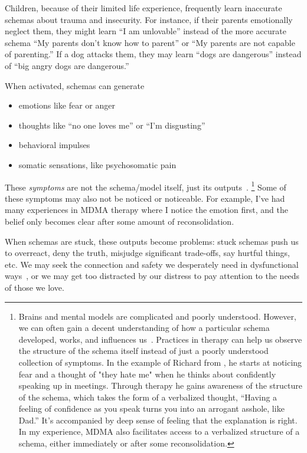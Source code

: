 \documentclass[11pt,oneside]{book}
\let\cite\parencite
\begin{document}
Children, because of their limited life experience, frequently learn inaccurate schemas about trauma and insecurity. For instance, if their parents emotionally neglect them, they might learn \enquote{I am unlovable} instead of the more accurate schema \enquote{My parents don't know how to parent} or \enquote{My parents are not capable of parenting.} If a dog attacks them, they may learn \enquote{dogs are dangerous} instead of \enquote{big angry dogs are dangerous.}

When activated, schemas can generate~\cite{eckerUnlocking}
\begin{itemize}
	\item emotions like fear or anger
	\item thoughts like \enquote{no one loves me} or \enquote{I'm disgusting}
	\item behavioral impulses
	\item somatic sensations, like psychosomatic pain
\end{itemize}

These \textit{symptoms} are not the schema/model itself, just its outputs~\cite{eckerUnlocking}. \footnote{\label{retrieval}Brains and mental models are complicated and poorly understood. However, we can often gain a decent understanding of how a particular schema developed, works, and influences us~\cite{eckerUnlocking}. Practices in therapy can help us observe the structure of the schema itself instead of just a poorly understood collection of symptoms. In the example of Richard from \textcite{eckerUnlocking}, he starts at noticing fear and a thought of "they hate me" when he thinks about confidently speaking up in meetings. Through therapy he gains awareness of the structure of the schema, which takes the form of a verbalized thought, \enquote{Having a feeling of confidence as you speak turns you into an arrogant asshole, like Dad.} It's accompanied by deep sense of feeling that the explanation is right. In my experience, MDMA also facilitates access to a verbalized structure of a schema, either immediately or after some reconsolidation.} Some of these symptoms may also not be noticed or noticeable. For example, I've had many experiences in MDMA therapy where I notice the emotion first, and the belief only becomes clear after some amount of reconsolidation.

When schemas are stuck, these outputs become problems: stuck schemas push us to overreact, deny the truth, misjudge significant trade-offs, say hurtful things, etc. We may seek the connection and safety we desperately need in dysfunctional ways~\cite{brownAttachmentDisturbances}, or we may get too distracted by our distress to pay attention to the needs of those we love.
\end{document}
